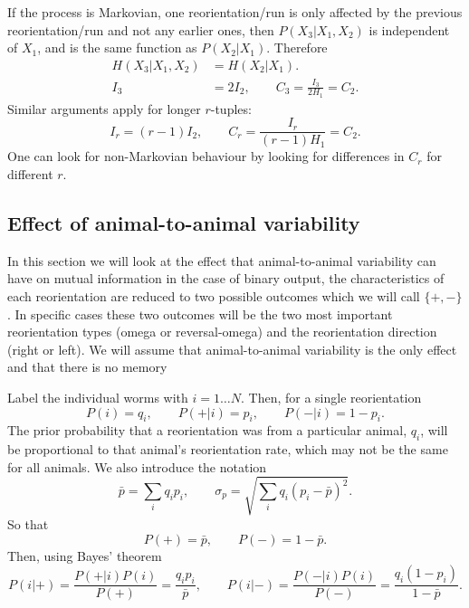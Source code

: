 \documentclass[12pt]{article}
\begin{document}
If the process is Markovian, \ie one reorientation/run is only affected by the previous reorientation/run and not any earlier ones, then $P(X_3 \vert X_1,X_2)$ is independent of $X_1$, and is the same function as $P(X_2 \vert X_1)$. Therefore
%
\begin{equation}\label{eq:tripvspair}
  \begin{aligned}
    H(X_3|X_1,X_2) &= H(X_2|X_1).\\
    I_3 &= 2I_2, \qquad C_3 = \frac{I_3}{2H_1} = C_2.
  \end{aligned}
\end{equation}
%
Similar arguments apply for longer $r$-tuples:
 \begin{equation}\label{eq:markovinf}
   I_r = (r-1)I_2, \qquad C_r = \frac{I_r}{(r-1)H_1} = C_2.
\end{equation}
%
One can look for non-Markovian behaviour by looking for differences in $C_r$ for different $r$.


\subsection{Effect of animal-to-animal variability}\label{sec:variability}

In this section we will look at the effect that animal-to-animal variability can have on mutual information in the case of binary output, \ie the characteristics of each reorientation are reduced to two possible outcomes which we will call $\{+,-\}$. In specific cases these two outcomes will be the two most important reorientation types (omega or reversal-omega) and the reorientation direction (right or left). We will assume that animal-to-animal variability is the only effect and that there is no memory

Label the individual worms with $i=1\ldots N$. Then, for a single reorientation
%
\begin{equation}\label{eq:varisinglereo}
  P(i) = q_i, \qquad
  P(+|i) = p_i, \qquad
  P(-|i) = 1-p_i.
\end{equation}
%
The prior probability that a reorientation was from a particular animal, $q_i$, will be proportional to that animal's reorientation rate, which may not be the same for all animals. We also introduce the notation
%
\begin{equation}\label{eq:varinot}
  \bar{p} = \sum_i q_i p_i, \qquad
  \sigma_p = \sqrt{\sum_i q_i(p_i-\bar{p})^2}.
\end{equation}
%
So that
%
\begin{equation}\label{eq:varimarg}
  P(+) = \bar{p}, \qquad P(-) = 1-\bar{p}.
\end{equation}
%
Then, using Bayes' theorem
%
\begin{equation}\label{eq:singlereobayes}
  P(i|+) = \frac{P(+|i)P(i)}{P(+)} = \frac{q_ip_i}{\bar{p}}, \qquad
  P(i|-) = \frac{P(-|i)P(i)}{P(-)} = \frac{q_i(1-p_i)}{1-\bar{p}}.
\end{equation}
%
\end{document}
